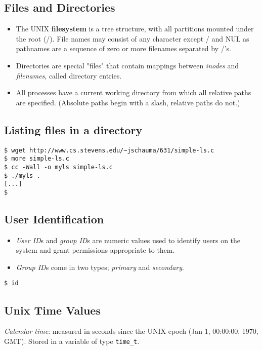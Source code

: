 \documentclass[xga]{xdvislides}
\begin{document}
\subsection{Files and Directories}
\begin{itemize}
	\item The UNIX {\bf filesystem} is a tree structure, with all partitions
		mounted under the root (/). File names may consist of any
		character except / and NUL as pathnames are a sequence of
		zero or more filenames separated by /'s.
	\item Directories are special "files" that contain mappings
		between {\em inodes} and {\em filenames}, called directory
		entries.
	\item All processes have a current working directory from which
		all relative paths are specified. (Absolute paths begin
		with a slash, relative paths do not.)
\end{itemize}

\subsection{Listing files in a directory}
\vspace*{\fill}
\begin{verbatim}
$ wget http://www.cs.stevens.edu/~jschauma/631/simple-ls.c
$ more simple-ls.c
$ cc -Wall -o myls simple-ls.c
$ ./myls .
[...]
$
\end{verbatim}
\vspace*{\fill}


\subsection{User Identification}
\begin{itemize}
	\item {\em User ID}s and {\em group ID}s are numeric values used to
		identify users on the system and grant permissions appropriate to them.
	\item {\em Group ID}s come in two types; {\em primary} and {\em secondary}.
\end{itemize}
\vspace{.25in}

\begin{verbatim}
$ id
\end{verbatim}

\subsection{Unix Time Values}
{\em Calendar time}: measured in seconds since the UNIX epoch (Jan
1, 00:00:00, 1970, GMT). Stored in a variable of type {\tt time\_t}.
\\
\end{document}
